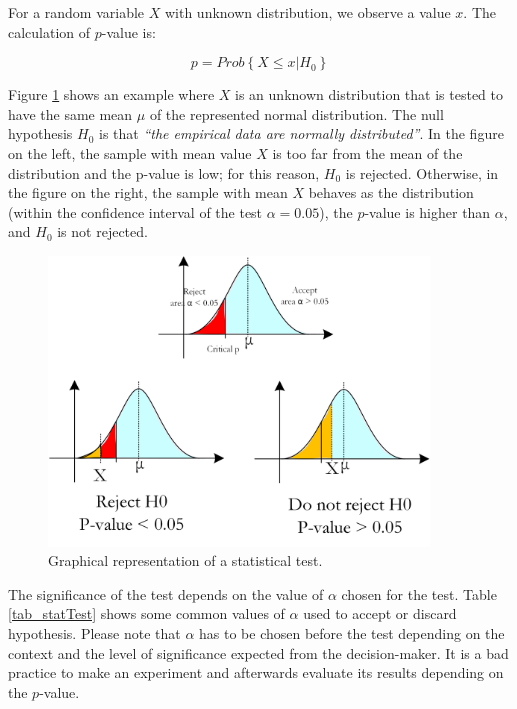 For a random variable $X$ with unknown distribution, we observe a value $x$. The calculation of $p$-value is:

\begin{equation}
p=Prob\left\{ X\le x|H_0\right\}
\label{eq_pvalue}
\end{equation}

Figure \ref{fig_StatTest} shows an example where $X$ is an unknown distribution that is tested to have the same mean $\mu$ of the represented normal distribution. The null hypothesis $H_0$ is that \textit{“the empirical data are normally distributed”}. In the figure on the left, the sample with mean value $X$ is too far from the mean of the distribution and the p-value is low; for this reason, $H_0$ is rejected. Otherwise, in the figure on the right, the sample with mean $X$ behaves as the distribution (within the confidence interval of the test $\alpha=0.05$), the $p$-value is higher than $\alpha$, and $H_0$ is not rejected.

\begin{figure}[hbt!]
\centering
\includegraphics[width=0.9\textwidth]{SectionLetsMath/elemStat_figures/fig_StatTest.png}
\captionsetup{type=figure}
\caption{Graphical representation of a statistical test.}
\label{fig_StatTest}
\end{figure}

The significance of the test depends on the value of $\alpha$ chosen for the test. Table \ref{tab_statTest} shows some common values of $\alpha$ used to accept or discard hypothesis. Please note that $\alpha$ has to be chosen before the test depending on the context and the level of significance expected from the decision-maker. It is a bad practice to make an experiment and afterwards evaluate its results depending on the $p$-value.

